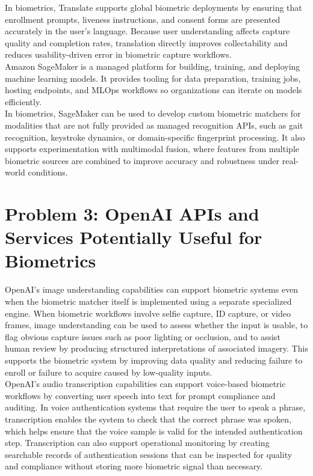 \documentclass[11pt]{article}
\begin{document}
In biometrics, Translate supports global biometric deployments by ensuring that enrollment prompts, liveness instructions, and consent forms are presented accurately in the user's language. Because user understanding affects capture quality and completion rates, translation directly improves collectability and reduces usability-driven error in biometric capture workflows. \\

Amazon SageMaker is a managed platform for building, training, and deploying machine learning models. It provides tooling for data preparation, training jobs, hosting endpoints, and MLOps workflows so organizations can iterate on models efficiently. \\

In biometrics, SageMaker can be used to develop custom biometric matchers for modalities that are not fully provided as managed recognition APIs, such as gait recognition, keystroke dynamics, or domain-specific fingerprint processing. It also supports experimentation with multimodal fusion, where features from multiple biometric sources are combined to improve accuracy and robustness under real-world conditions. \\

\section*{Problem 3: OpenAI APIs and Services Potentially Useful for Biometrics}

OpenAI's image understanding capabilities can support biometric systems even when the biometric matcher itself is implemented using a separate specialized engine. When biometric workflows involve selfie capture, ID capture, or video frames, image understanding can be used to assess whether the input is usable, to flag obvious capture issues such as poor lighting or occlusion, and to assist human review by producing structured interpretations of associated imagery. This supports the biometric system by improving data quality and reducing failure to enroll or failure to acquire caused by low-quality inputs. \\

OpenAI's audio transcription capabilities can support voice-based biometric workflows by converting user speech into text for prompt compliance and auditing. In voice authentication systems that require the user to speak a phrase, transcription enables the system to check that the correct phrase was spoken, which helps ensure that the voice sample is valid for the intended authentication step. Transcription can also support operational monitoring by creating searchable records of authentication sessions that can be inspected for quality and compliance without storing more biometric signal than necessary. \\
\end{document}
